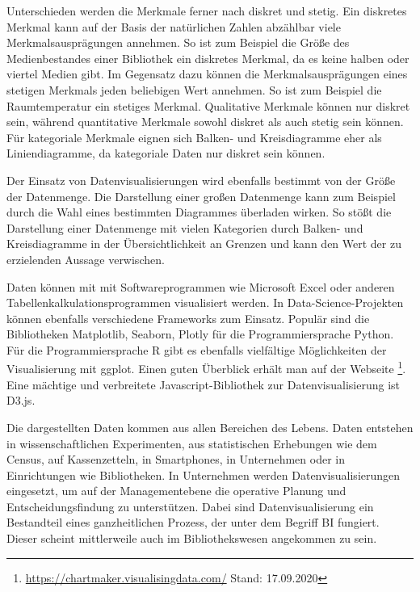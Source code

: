 Unterschieden werden die Merkmale ferner nach diskret und stetig.
Ein diskretes Merkmal kann auf der Basis der natürlichen Zahlen abzählbar viele Merkmalsausprägungen annehmen.
So ist zum Beispiel die Größe des Medienbestandes einer Bibliothek ein diskretes Merkmal, da es keine halben oder viertel Medien gibt.
Im Gegensatz dazu können die Merkmalsausprägungen eines stetigen Merkmals jeden beliebigen Wert annehmen. So ist zum Beispiel die Raumtemperatur ein stetiges Merkmal.
Qualitative Merkmale können nur diskret sein, während quantitative Merkmale sowohl diskret als auch stetig sein können. 
Für kategoriale Merkmale eignen sich Balken- und Kreisdiagramme eher als Liniendiagramme, da kategoriale Daten nur diskret sein können.

Der Einsatz von Datenvisualisierungen wird ebenfalls bestimmt von der Größe der Datenmenge.
Die Darstellung einer großen Datenmenge kann zum Beispiel durch die Wahl eines bestimmten Diagrammes überladen wirken. 
So stößt die Darstellung einer Datenmenge mit vielen Kategorien durch Balken- und Kreisdiagramme 
in der Übersichtlichkeit an Grenzen und kann den Wert der zu erzielenden Aussage verwischen. 

Daten können mit mit Softwareprogrammen wie Microsoft Excel oder anderen Tabellenkalkulationsprogrammen visualisiert werden.
In Data-Science-Projekten können ebenfalls verschiedene Frameworks zum Einsatz. Populär sind die Bibliotheken Matplotlib, Seaborn, Plotly für 
die Programmiersprache Python. Für die Programmiersprache R gibt es ebenfalls vielfältige Möglichkeiten der Visualisierung mit
ggplot. Einen guten Überblick erhält man auf der Webseite \footnote{\url{https://chartmaker.visualisingdata.com/} Stand: 17.09.2020}.
Eine mächtige und verbreitete Javascript-Bibliothek zur Datenvisualisierung ist D3.js.


Die dargestellten Daten kommen aus allen Bereichen des Lebens. Daten entstehen in wissenschaftlichen Experimenten, aus statistischen Erhebungen wie 
dem Census, auf Kassenzetteln, in Smartphones, in Unternehmen oder in Einrichtungen wie Bibliotheken. 
In Unternehmen werden Datenvisualisierungen eingesetzt, um auf der Managementebene die operative Planung und Entscheidungsfindung zu unterstützen.
Dabei sind Datenvisualisierung ein Bestandteil eines ganzheitlichen Prozess, der unter dem Begriff \acrfull{BI} fungiert. Dieser scheint mittlerweile auch im Bibliothekswesen angekommen zu sein.


